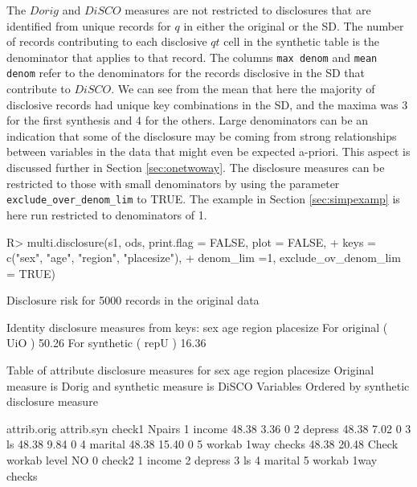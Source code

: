 \documentclass[12pt]{article}
\renewcommand{\baselinestretch}{1.5} %
\begin{document}
The $Dorig$ and $DiSCO$ measures are not restricted to disclosures that are identified from unique records for $q$ in either the original or the SD. The number of records contributing to each disclosive $qt$ cell in the synthetic table is the denominator that applies to that record. The columns \texttt{max denom} and \texttt{mean denom} refer to the denominators for the records disclosive in the SD that contribute to $DiSCO$. We can see from the mean that here the majority of disclosive records had unique key combinations in the SD, and the maxima was 3 for the first synthesis and 4 for the others. Large denominators can be an indication that some of the disclosure may be coming from strong relationships between variables in the data that might even be expected 
a-priori. This aspect is discussed further in Section \ref{sec:onetwoway}. The disclosure measures can be restricted to those with small denominators by using
the parameter \texttt{exclude\_over\_denom\_lim} to TRUE. The example in Section \ref{sec:simpexamp} is here run restricted to denominators of 1.
\renewcommand{\baselinestretch}{1.0}
\begin{Schunk}
\begin{Sinput}
R> multi.disclosure(s1, ods, print.flag = FALSE, plot = FALSE,
+    keys = c("sex", "age", "region", "placesize"),
+    denom_lim =1, exclude_ov_denom_lim = TRUE)
\end{Sinput}
\begin{Soutput}
Disclosure risk for 5000 records in the original data

Identity disclosure measures
from keys: sex age region placesize 
For original  ( UiO )  50.26 %
For synthetic ( repU ) 16.36 %

Table of attribute disclosure measures for sex age region placesize 
Original measure is  Dorig and synthetic measure is DiSCO 
Variables Ordered by synthetic disclosure measure

                     attrib.orig attrib.syn                   check1 Npairs
1 income                   48.38       3.36                               0
2 depress                  48.38       7.02                               0
3 ls                       48.38       9.84                               0
4 marital                  48.38      15.40                               0
5 workab 1way checks       48.38      20.48 Check  workab  level  NO      0
                     check2
1 income                   
2 depress                  
3 ls                       
4 marital                  
5 workab 1way checks       
\end{Soutput}
\end{Schunk}
\renewcommand{\baselinestretch}{1.5}
\end{document}
